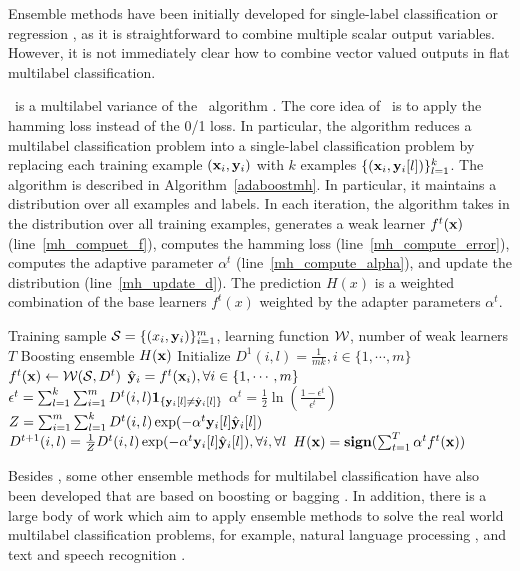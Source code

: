 {Ensemble methods have been initially developed for single-label classification \citep{Breiman96bagging,Freund97a} or regression \citep{Breiman96bagging}, as it is straightforward to combine multiple scalar output variables.
However, it is not immediately clear how to combine vector valued outputs in flat multilabel classification.

\adaboostmh\ is a multilabel variance of the \adaboost\ algorithm \citep{Schapire99improved,Esuli2008boosting}.
The core idea of \adaboostmh\ is to apply the hamming loss instead of the 0/1 loss. 
In particular, the algorithm reduces a multilabel classification problem into a single-label classification problem by replacing each training example $(\mathbf {x}_i,\mathbf {y}_i)$ with $k$ examples $\{(\mathbf {x}_i,\mathbf {y}_i[l])\}_{l=1}^k$.
The algorithm is described in Algorithm~\ref{adaboostmh}.
In particular, it maintains a distribution over all examples and labels.
In each iteration, the algorithm takes in the distribution over all training examples, generates a weak learner $f^t(\mathbf {x})$ (line~\ref{mh_compuet_f}), computes the hamming loss (line~\ref{mh_compute_error}), computes the adaptive parameter $\alpha^t$ (line~\ref{mh_compute_alpha}), and update the distribution (line~\ref{mh_update_d}).
The prediction $H(x)$ is a weighted combination of the base learners $f^t(x)$ weighted by the adapter parameters $\alpha^t$.
\begin{algorithm}
\caption{\adaboostmh}
\label{adaboostmh}
\begin{algorithmic}[1]
	\REQUIRE Training sample $\mathcal{S} = \{(x_i,\mathbf {y}_i)\}_{i=1}^m$, learning function $\mathcal{W}$, number of weak learners $T$
	\ENSURE Boosting ensemble $H(\mathbf {x})$
	\STATE Initialize $D^1(i,l)=\frac{1}{mk},i\in\{1,\cdots,m\}$
		\STATE $f^t(\mathbf {x})\leftarrow\mathcal{W}(\mathcal{S},D^{t})$ \label{mh_compuet_f}
		\STATE $\hat{\mathbf {y}}_i = f^t(\mathbf {x}_i),\forall i\in\{1,\cdots,m\}$
		\STATE $\epsilon^t =\sum_{l=1}^k\sum_{i=1}^{m}D^t(i,l)\mathbf{1}_{\{\mathbf {y}_i[l]\neq\hat{\mathbf {y}}_i[l]\}}$ \label{mh_compute_error}
		\STATE $\alpha^{t} = \frac{1}{2}\ln\left(\frac{1-\epsilon^t}{\epsilon^t}\right)$ \label{mh_compute_alpha}
		\STATE $Z=\sum_{i=1}^{m}\sum_{l=1}^{k}D^{t}(i,l)\exp(-\alpha^t\mathbf {y}_i[l]\hat{\mathbf {y}}_i[l])$
		\STATE $D^{t+1}(i,l) = \frac{1}{Z}D^{t}(i,l)\exp(-\alpha^t\mathbf {y}_i[l]\hat{\mathbf {y}}_i[l]),\forall i,\forall l$ \label{mh_update_d}
	\ENDFOR
	\RETURN $H(\mathbf {x}) = \textbf{sign}(\sum_{t=1}^T\alpha^tf^t(\mathbf {x}))$
\end{algorithmic}
\end{algorithm}

Besides \adaboostmh, some other ensemble methods for multilabel classification have also been developed that are based on boosting or bagging \citep{Wang07simple,Yan07model,Kocev13tree}.
In addition, there is a large body of work which aim to apply ensemble methods to solve the real world multilabel classification problems, for example, natural language processing \citep{Collins05distrimnative,Zeman05improving,Sagae06parsing,Zhang09kbest}, and text and speech recognition \citep{Fiscus97a,Benesty08speech,Petrov10products}.


}
